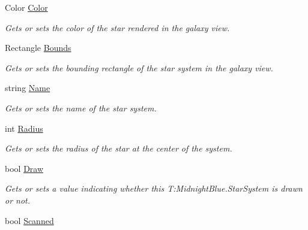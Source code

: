 \begin{DoxyCompactItemize}
\item 
Color \hyperlink{class_midnight_blue_1_1_star_system_a23bc9f35df49f8411cb72bc3385dd90b}{Color}
\begin{DoxyCompactList}\small\item\em Gets or sets the color of the star rendered in the galaxy view. \end{DoxyCompactList}\item 
Rectangle \hyperlink{class_midnight_blue_1_1_star_system_ad850b29423ea1ae941e8d4f3e16b9283}{Bounds}
\begin{DoxyCompactList}\small\item\em Gets or sets the bounding rectangle of the star system in the galaxy view. \end{DoxyCompactList}\item 
string \hyperlink{class_midnight_blue_1_1_star_system_a63adfd0ef7d74bb7d5f224bb2df75aa5}{Name}
\begin{DoxyCompactList}\small\item\em Gets or sets the name of the star system. \end{DoxyCompactList}\item 
int \hyperlink{class_midnight_blue_1_1_star_system_ad837a031fcd4a423ebb79cd8531d8a20}{Radius}
\begin{DoxyCompactList}\small\item\em Gets or sets the radius of the star at the center of the system. \end{DoxyCompactList}\item 
bool \hyperlink{class_midnight_blue_1_1_star_system_a9909c0e06a0fb6dc2dd657f00b61911a}{Draw}
\begin{DoxyCompactList}\small\item\em Gets or sets a value indicating whether this T\+:\+Midnight\+Blue.\+Star\+System is drawn or not. \end{DoxyCompactList}\item 
bool \hyperlink{class_midnight_blue_1_1_star_system_ae0486aa129a103b96f1fbfe9e09b41ca}{Scanned}

\end{DoxyCompactItemize}
